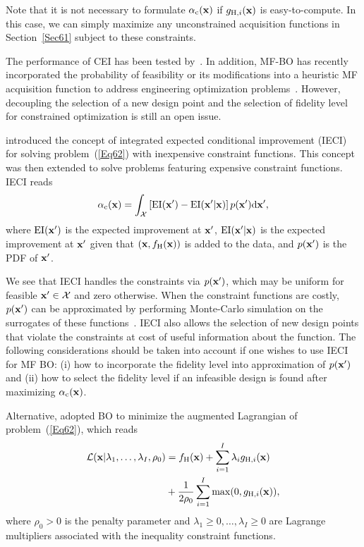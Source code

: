 \documentclass[iicol,sn-basic]{sn-jnl}%
\theoremstyle{thmstyleone}%
\theoremstyle{thmstyletwo}
\theoremstyle{thmstylethree}
\begin{document}
\begin{linenumbers}
Note that it is not necessary to formulate $\alpha_\text{c}({\bf x})$ if $g_{\text{H},i}({\bf x})$ is easy-to-compute.
In this case, we can simply maximize any unconstrained acquisition functions in Section~\ref{Sec61} subject to these constraints.

The performance of CEI has been tested by~\cite{Gardner2014,Sobester2014,Kontogiannis2020b}.
In addition, MF-BO has recently incorporated the probability of feasibility or its modifications into a heuristic MF acquisition function to address engineering optimization problems~\citep{Ghoreishi2019,Ruan2020,Ribeiro2023}.
However, decoupling the selection of a new design point and the selection of fidelity level for constrained optimization is still an open issue.

\cite{Gramacy2011} introduced the concept of integrated expected conditional improvement (IECI) for solving problem~(\ref{Eq62}) with inexpensive constraint functions.
This concept was then extended to solve problems featuring expensive constraint functions.
IECI reads
\begin{equation}\label{Eq65}
	\alpha_\text{c}({\bf x}) = \int_{\mathcal{X}} \left[\text{EI}({\bf x'}) - \text{EI}({\bf x'}|{\bf x})\right] p({\bf x'}) \text{d}{\bf x'},
\end{equation}
where $\text{EI}({\bf x'})$ is the expected improvement at $\bf x'$, $\text{EI}({\bf x'}|{\bf x})$ is the expected improvement at $\bf x'$ given that $\left({\bf x},f_\text{H}({\bf x})\right)$ is added to the data, and $p({\bf x'})$ is the PDF of ${\bf x'}$.

We see that IECI handles the constraints via $p({\bf x'})$, which may be uniform for feasible ${\bf x'} \in \mathcal{X}$ and zero otherwise.
When the constraint functions are costly, $p({\bf x'})$ can be approximated by performing Monte-Carlo simulation on the surrogates of these functions~\citep{Gramacy2011}.
IECI also allows the selection of new design points that violate the constraints at cost of useful information about the function.
The following considerations should be taken into account if one wishes to use IECI for MF BO: (i) how to incorporate the fidelity level into approximation of $p({\bf x'})$ and (ii) how to select the fidelity level if an infeasible design is found after maximizing $\alpha_\text{c}({\bf x})$.  

Alternative, \cite{Gramacy2016} adopted BO to minimize the augmented Lagrangian of problem~(\ref{Eq62}), which reads
\begin{equation}\label{Eq66}
	\begin{aligned}
	 	\mathcal{L}({\bf x}|\lambda_1,\dots,\lambda_I,\rho_0) & = f_\text{H}({\bf x}) + \sum_{i=1}^{I} \lambda_i g_{\text{H},i}({\bf x}) \\
	 	& + \frac{1}{2 \rho_0} \sum_{i=1}^{I} \max(0,g_{\text{H},i}({\bf x})), 
	\end{aligned} 
\end{equation}
where  $\rho_0>0$ is the penalty parameter and $\lambda_1 \geq 0,\dots,\lambda_I \geq 0$ are Lagrange multipliers associated with the inequality constraint functions.


\end{linenumbers}
\end{document}
